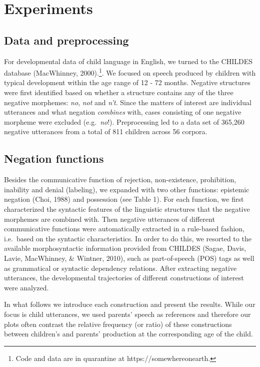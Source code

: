 \documentclass[10pt, letterpaper]{article}
\begin{document}
\hypertarget{experiments}{%
\section{Experiments}\label{experiments}}

\hypertarget{data-and-preprocessing}{%
\subsection{Data and preprocessing}\label{data-and-preprocessing}}

For developmental data of child language in English, we turned to the
CHILDES database (MacWhinney,
2000).\footnote{Code and data are in quarantine at https://somewhereonearth.}.
We focused on speech produced by children with typical development
within the age range of 12 - 72 months. Negative structures were first
identified based on whether a structure contains any of the three
negative morphemes: \emph{no}, \emph{not} and \emph{n't}. Since the
matters of interest are individual utterances and what negation
\emph{combines} with, cases consisting of one negative morpheme were
excluded (e.g.~\emph{no}!). Preprocessing led to a data set of 365,260
negative utterances from a total of 811 children across 56 corpora.

\hypertarget{negation-functions}{%
\subsection{Negation functions}\label{negation-functions}}

Besides the communicative function of rejection, non-existence,
prohibition, inability and denial (labeling), we expanded with two other
functions: epistemic negation (Choi, 1988) and possession (see Table 1).
For each function, we first characterized the syntactic features of the
linguistic structures that the negative morphemes are combined with.
Then negative utterances of different communicative functions were
automatically extracted in a rule-based fashion, i.e.~based on the
syntactic characteristics. In order to do this, we resorted to the
available morphosyntactic information provided from CHILDES (Sagae,
Davis, Lavie, MacWhinney, \& Wintner, 2010), such as part-of-speech
(POS) tags as well as grammatical or syntactic dependency relations.
After extracting negative utterances, the developmental trajectories of
different constructions of interest were analyzed.

In what follows we introduce each construction and present the results.
While our focus is child utterances, we used parents' speech as
references and therefore our plots often contrast the relative frequency
(or ratio) of these constructions between children's and parents'
production at the corresponding age of the child.
\end{document}
